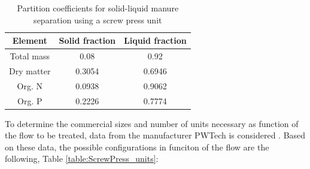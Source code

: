 \documentclass[10pt,a4paper]{article}
\begin{document}
\begin{table}[H] 
	\begin{adjustwidth}{}{}
		\centering
		\caption{Partition coefficients for solid-liquid manure separation using a screw press unit \cite{MollerSLsep}} \label{table:part_coef}
		\begin{tabular}{c c c}
			\toprule
			Element 	& Solid fraction & Liquid fraction	\\ \midrule
			Total mass 	& 0.08		& 0.92 \\
			Dry matter 	& 0.3054	& 0.6946 \\
			Org. N 		& 0.0938	& 0.9062 \\
			Org. P		& 0.2226 	& 0.7774 \\
		\end{tabular}
	\end{adjustwidth}
\end{table}

To determine the commercial sizes and number of units necessary as function of the flow to be treated, data from the manufacturer PWTech is considered \cite{PWTech}. Based on these data, the possible configurations in funciton of the flow are the following, Table \ref{table:ScrewPress_units}:
\end{document}
